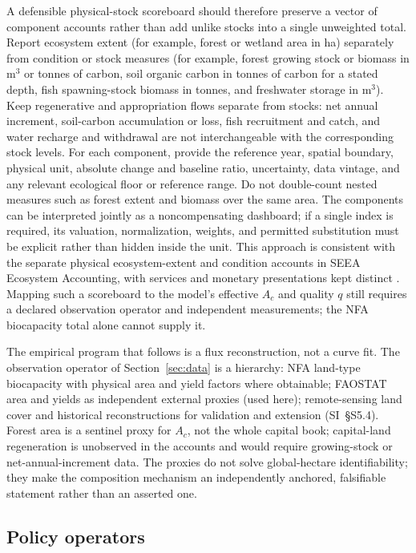 \documentclass[preprint,12pt,authoryear]{elsarticle}
\begin{document}
A defensible physical-stock scoreboard should therefore preserve a vector of component accounts rather than add unlike stocks into a single unweighted total. Report ecosystem extent (for example, forest or wetland area in ha) separately from condition or stock measures (for example, forest growing stock or biomass in m$^3$ or tonnes of carbon, soil organic carbon in tonnes of carbon for a stated depth, fish spawning-stock biomass in tonnes, and freshwater storage in m$^3$). Keep regenerative and appropriation flows separate from stocks: net annual increment, soil-carbon accumulation or loss, fish recruitment and catch, and water recharge and withdrawal are not interchangeable with the corresponding stock levels. For each component, provide the reference year, spatial boundary, physical unit, absolute change and baseline ratio, uncertainty, data vintage, and any relevant ecological floor or reference range. Do not double-count nested measures such as forest extent and biomass over the same area. The components can be interpreted jointly as a noncompensating dashboard; if a single index is required, its valuation, normalization, weights, and permitted substitution must be explicit rather than hidden inside the unit. This approach is consistent with the separate physical ecosystem-extent and condition accounts in SEEA Ecosystem Accounting, with services and monetary presentations kept distinct \citep{UN2021SEEA_EA}. Mapping such a scoreboard to the model's effective $A_c$ and quality $q$ still requires a declared observation operator and independent measurements; the NFA biocapacity total alone cannot supply it.

The empirical program that follows is a flux reconstruction, not a curve fit. The observation operator of Section~\ref{sec:data} is a hierarchy: NFA land-type biocapacity with physical area and yield factors where obtainable; FAOSTAT area and yields as independent external proxies (used here); remote-sensing land cover and historical reconstructions for validation and extension (SI~\S S5.4). Forest area is a sentinel proxy for $A_c$, not the whole capital book; capital-land regeneration is unobserved in the accounts and would require growing-stock or net-annual-increment data. The proxies do not solve global-hectare identifiability; they make the composition mechanism an independently anchored, falsifiable statement rather than an asserted one.

\subsection{Policy operators}
\end{document}
